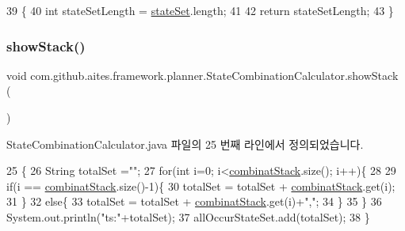 \begin{DoxyCode}
39                                   \{
40         \textcolor{keywordtype}{int} stateSetLength = \mbox{\hyperlink{classcom_1_1github_1_1aites_1_1framework_1_1planner_1_1_state_combination_calculator_af0002d5e5c2d3034f606f4586d7796a8}{stateSet}}.length;
41         
42         \textcolor{keywordflow}{return} stateSetLength;
43     \}
\end{DoxyCode}
\mbox{\label{classcom_1_1github_1_1aites_1_1framework_1_1planner_1_1_state_combination_calculator_a50816c67726a7d23e579994f5fa66315}} 
\subsubsection{\texorpdfstring{show\+Stack()}{showStack()}}
{\footnotesize\ttfamily void com.\+github.\+aites.\+framework.\+planner.\+State\+Combination\+Calculator.\+show\+Stack (\begin{DoxyParamCaption}{ }\end{DoxyParamCaption})\hspace{0.3cm}{\ttfamily [private]}}



State\+Combination\+Calculator.\+java 파일의 25 번째 라인에서 정의되었습니다.


\begin{DoxyCode}
25                             \{
26         String totalSet =\textcolor{stringliteral}{""};
27         \textcolor{keywordflow}{for}(\textcolor{keywordtype}{int} i=0; i<\mbox{\hyperlink{classcom_1_1github_1_1aites_1_1framework_1_1planner_1_1_state_combination_calculator_a9c0cc6dedc79509276f6afd36ffbfa6c}{combinatStack}}.size(); i++)\{
28             
29             \textcolor{keywordflow}{if}(i == \mbox{\hyperlink{classcom_1_1github_1_1aites_1_1framework_1_1planner_1_1_state_combination_calculator_a9c0cc6dedc79509276f6afd36ffbfa6c}{combinatStack}}.size()-1)\{
30                 totalSet = totalSet + \mbox{\hyperlink{classcom_1_1github_1_1aites_1_1framework_1_1planner_1_1_state_combination_calculator_a9c0cc6dedc79509276f6afd36ffbfa6c}{combinatStack}}.get(i);
31             \}
32             \textcolor{keywordflow}{else}\{
33                 totalSet = totalSet + \mbox{\hyperlink{classcom_1_1github_1_1aites_1_1framework_1_1planner_1_1_state_combination_calculator_a9c0cc6dedc79509276f6afd36ffbfa6c}{combinatStack}}.get(i)+\textcolor{stringliteral}{","};
34             \}
35         \}
36         System.out.println(\textcolor{stringliteral}{"ts:"}+totalSet);
37         allOccurStateSet.add(totalSet);
38     \}
\end{DoxyCode}


